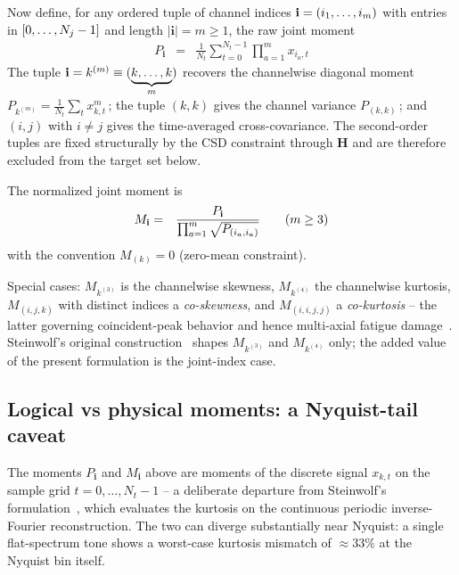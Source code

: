 \documentclass[10pt,a4paper]{article}
\numberwithin{equation}{section}
\DeclarePairedDelimiter\block{[}{]}
\DeclarePairedDelimiter\mat{(}{)}
\begin{document}
Now define, for any ordered tuple of channel indices $\mathbf{i} = \mat{i_1,\ldots,i_m}$ with entries in $\block{0,\ldots,N_j-1}$ and length $|\mathbf{i}|=m\geq 1$, the raw joint moment
\begin{eqnarray}
P_\mathbf{i} &=& \frac{1}{N_t}\sum_{t=0}^{N_t-1} \prod_{a=1}^{m} x_{i_a, t}
\end{eqnarray}
The tuple $\mathbf{i} = k^{(m)} \equiv \mat{\underbrace{k,\ldots,k}_{m}}$ recovers the channelwise diagonal moment $P_{k^{(m)}} = \frac{1}{N_t}\sum_t x_{k,t}^m\,$; the tuple $(k,k)$ gives the channel variance $P_{(k,k)}\,$; and $(i,j)$ with $i\neq j$ gives the time-averaged cross-covariance. The second-order tuples are fixed structurally by the CSD constraint through $\mathbf{H}$ and are therefore excluded from the target set below.

The normalized joint moment is
\begin{eqnarray}
M_\mathbf{i} &=& \frac{P_\mathbf{i}}{\prod_{a=1}^{m} \sqrt{P_{\mat{i_a,i_a}}}} \qquad \mat{m \geq 3}
\end{eqnarray}
with the convention $M_{(k)} = 0$ (zero-mean constraint). 

Special cases: $M_{k^{(3)}}$ is the channelwise skewness, $M_{k^{(4)}}$ the channelwise kurtosis, $M_{(i,j,k)}$ with distinct indices a \emph{co-skewness}, and $M_{(i,i,j,j)}$ a \emph{co-kurtosis} -- the latter governing coincident-peak behavior and hence multi-axial fatigue damage~\cite{saathoff2006synthetic}. Steinwolf's original construction~\cite{steinwolf2011ifft} shapes $M_{k^{(3)}}$ and $M_{k^{(4)}}$ only; the added value of the present formulation is the joint-index case.

\subsection*{Logical vs physical moments: a Nyquist-tail caveat}

The moments $P_\mathbf{i}$ and $M_\mathbf{i}$ above are moments of the discrete signal $x_{k,t}$ on the sample grid $t=0,\ldots,N_t-1$ -- a deliberate departure from Steinwolf's formulation~\cite{steinwolf2011ifft,steinwolf_book_ngaussian}, which evaluates the kurtosis on the continuous periodic inverse-Fourier reconstruction. The two can diverge substantially near Nyquist: a single flat-spectrum tone shows a worst-case kurtosis mismatch of ${\approx}33\%$ at the Nyquist bin itself. 
\end{document}
